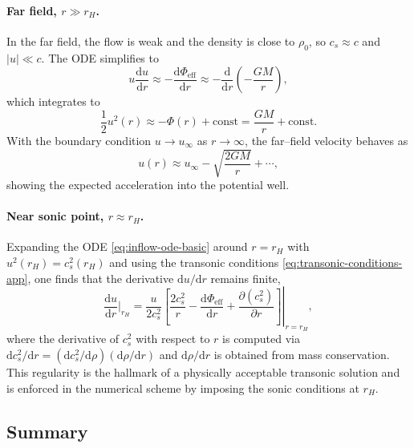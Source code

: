 \documentclass[11pt]{article}
\begin{document}
\paragraph{Far field, \(r \gg r_H\).}
In the far field, the flow is weak and the density is close to \(\rho_0\),
so \(c_s \approx c\) and \(|u| \ll c\).  The ODE simplifies to
\begin{equation}
  u \frac{\mathrm{d}u}{\mathrm{d}r}
  \approx - \frac{\mathrm{d}\Phi_{\text{eff}}}{\mathrm{d}r}
  \approx -\frac{\mathrm{d}}{\mathrm{d}r}
          \left( -\frac{G M}{r} \right),
\end{equation}
which integrates to
\begin{equation}
  \frac{1}{2} u^2(r)
  \approx -\Phi(r) + \text{const}
  = \frac{G M}{r} + \text{const}.
\end{equation}
With the boundary condition \(u \to u_{\infty}\) as \(r \to \infty\), the
far--field velocity behaves as
\begin{equation}
  u(r)
  \approx u_{\infty}
    - \sqrt{\frac{2 G M}{r}}
    + \cdots,
\end{equation}
showing the expected acceleration into the potential well.

\paragraph{Near sonic point, \(r \approx r_H\).}
Expanding the ODE \eqref{eq:inflow-ode-basic} around \(r = r_H\) with
\(u^2(r_H) = c_s^2(r_H)\) and using the transonic conditions
\eqref{eq:transonic-conditions-app}, one finds that the derivative
\(\mathrm{d}u/\mathrm{d}r\) remains finite,
\begin{equation}
  \frac{\mathrm{d}u}{\mathrm{d}r}\bigg|_{r_H}
  = \left.
      \frac{u}{2 c_s^2}
      \left[
        \frac{2 c_s^2}{r}
        - \frac{\mathrm{d}\Phi_{\text{eff}}}{\mathrm{d}r}
        + \frac{\partial (c_s^2)}{\partial r}
      \right]
    \right|_{r = r_H},
\end{equation}
where the derivative of \(c_s^2\) with respect to \(r\) is computed via
\(\mathrm{d}c_s^2/\mathrm{d}r
= (\mathrm{d}c_s^2/\mathrm{d}\rho)(\mathrm{d}\rho/\mathrm{d}r)\) and
\(\mathrm{d}\rho/\mathrm{d}r\) is obtained from mass conservation.  This
regularity is the hallmark of a physically acceptable transonic solution and
is enforced in the numerical scheme by imposing the sonic conditions at
\(r_H\).

\subsection{Summary}
\label{app:inflow-summary}
\end{document}
